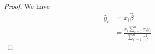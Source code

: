 
\begin{proof}
    We have
    \begin{equation*}
        \begin{split}
            \hat{y}_i &= x_i \hat{\beta} \\
                      &= \frac{x_i \sum_{i=1}^{n} x_i y_i}{\sum_{i'=1}^{n} x_{i'}^{2}}
        \end{split}
    \end{equation*}
\end{proof}
